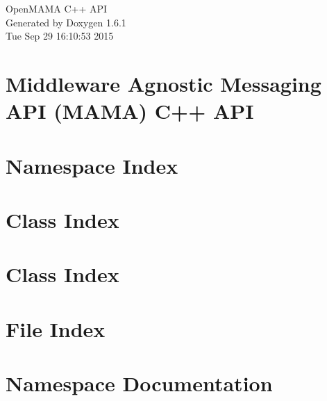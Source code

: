 \documentclass[a4paper]{book}
\begin{document}
\hypersetup{pageanchor=false}
\begin{titlepage}
\vspace*{7cm}
\begin{center}
{\Large OpenMAMA C++ API }\\
\vspace*{1cm}
{\large Generated by Doxygen 1.6.1}\\
\vspace*{0.5cm}
{\small Tue Sep 29 16:10:53 2015}\\
\end{center}
\end{titlepage}
\clearemptydoublepage
{}
\tableofcontents
\clearemptydoublepage
{}
\hypersetup{pageanchor=true}
\chapter{Middleware Agnostic Messaging API (MAMA) C++ API}
\label{index}\hypertarget{index}{}
\chapter{Namespace Index}

\chapter{Class Index}

\chapter{Class Index}

\chapter{File Index}

\chapter{Namespace Documentation}

\end{document}
